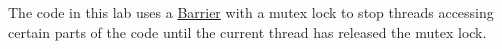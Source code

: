 The code in this lab uses a \hyperlink{class_barrier}{Barrier} with a mutex lock to stop threads accessing certain parts of the code until the current thread has released the mutex lock. 
